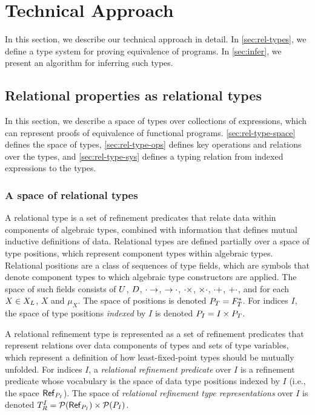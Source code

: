 \section{Technical Approach}
%
In this section, we describe our technical approach in detail.
%
In \autoref{sec:rel-types}, we define a type system for proving
equivalence of programs.
%
In \autoref{sec:infer}, we present an algorithm for
inferring such types.

\subsection{Relational properties as relational types}
\label{sec:rel-types}
%
In this section, we describe a space of types over collections of
expressions, which can represent proofs of equivalence of functional
programs.
%
\autoref{sec:rel-type-space} defines the space of types, %
\autoref{sec:rel-type-ops} defines key operations and relations over
the types, and %
\autoref{sec:rel-type-sys} defines a typing relation from indexed
expressions to the types.

\subsubsection{A space of relational types}
\label{sec:rel-type-space}
A relational type is a set of refinement predicates that relate data
within components of algebraic types, combined with information that
defines mutual inductive definitions of data.
%
Relational types are defined partially over a space of type positions,
which represent component types within algebraic types.
%
Relational positions are a class of sequences of type fields, which
are symbols that denote component types to which algebraic type
constructors are applied.
%
The space of such fields consists of $U$, $D$,
$\cdot \to$, $\to \cdot$, $\cdot \times$, $\times \cdot$,
$\cdot +$, $+ \cdot$, and for each $X \in X_L$, $X$ and
$\mu_X$.
%
The space of positions is denoted $P_T = F_T^{*}$.
For indices $I$, the space of type positions \emph{indexed} by $I$ is
denoted $P_{I} = I \times P_T$.

A relational refinement type is represented as a set of refinement
predicates that represent relations over data components of types and
sets of type variables, which represent a definition of how
least-fixed-point types should be mutually unfolded.
%
%
For indices $I$, a \emph{relational refinement predicate} over $I$ is
a refinement predicate whose vocabulary is the space of data type
positions indexed by $I$ (i.e., the space
$\mathsf{Ref}_{ P_{I} }$).
%
The space of \emph{relational refinement type representations} over
$I$ is denoted
$T_{R}^{I} = \mathcal{P}(\mathsf{Ref}_{ P_{I} }) \times
\mathcal{P}(P_{I})$.

